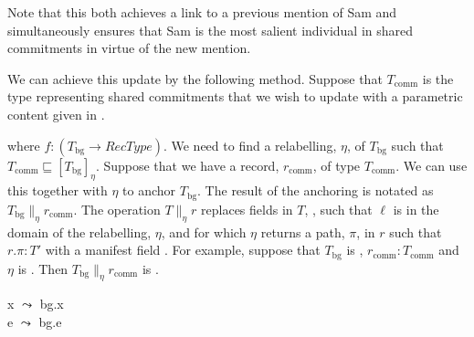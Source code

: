Note that this both achieves a link to a previous mention of Sam and
simultaneously ensures that Sam is the most salient individual in
shared commitments in virtue of the new mention.


We can achieve this update by the following method.  Suppose that $T_{\mathrm{comm}}$ is the
type representing shared commitments that we wish to update with a
parametric content given in \nexteg{}.
\begin{ex}
\end{ex}
where $f:(T_{\mathrm{bg}}\rightarrow\textit{RecType})$.  %
We
need to find a relabelling, $\eta$, of 
$T_{\mathrm{bg}}$ such that $T_{\mathrm{comm}}\sqsubseteq[T_{\mathrm{bg}}]_\eta$.
Suppose that we have a record, $r_{\mathrm{comm}}$, of type
$T_{\mathrm{comm}}$.  We can use this together with $\eta$ to anchor
$T_{\mathrm{bg}}$.  The result of the anchoring is notated as 
$T_{\mathrm{bg}}\parallel_\eta r_{\mathrm{comm}}$. The operation
$T \parallel_\eta r$ %
replaces fields in $T$, , such
that $\ell$ is in the
domain of the relabelling, $\eta$, and for which $\eta$ returns a
path, $\pi$,
in $r$ such that $r.\pi:T'$ with a manifest
field . For example,
suppose that $T_{\mathrm{bg}}$ is ,
$r_{\mathrm{comm}}:T_{\mathrm{comm}}$ and $\eta$ is . Then
\mbox{$T_{\mathrm{bg}}\parallel_\eta r_{\mathrm{comm}}$} is .
\begin{ex} 
\begin{subex} 
 
\item {} 
 
\item x $\leadsto$ bg.x\\
      e $\leadsto$ bg.e

\item {}
 
\end{subex} 
   
\end{ex} 
  

